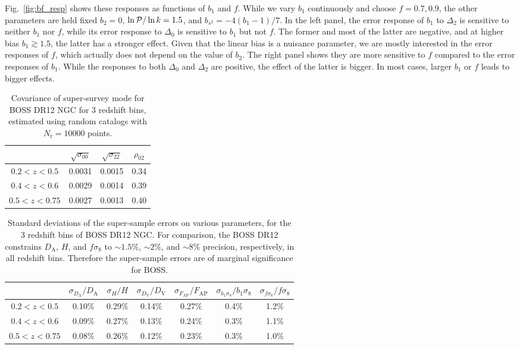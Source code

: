 \documentclass[a4paper,11pt]{article}
\let\d\relax
\DeclareMathOperator{\d}{d}
\newcommand{\Dist}[1]{D_\mathrm{#1}}
\newcommand{\FAP}{F_\mathrm{AP}}
\newcommand{\Pdimless}{\mathcal{P}}
\newcommand{\ran}{\mathrm{r}}
\begin{document}
Fig.~\ref{fig:bf_resp} shows these responses as functions of $b_1$ and $f$.
While we vary $b_1$ continuously and choose $f=0.7,0.9$, the other parameters
are held fixed $b_2=0$, $\d\ln\Pdimless/\d\ln k=1.5$, and $b_{s^2}=-4(b_1-1)/7$.
In the left panel, the error response of $b_1$ to $\Delta_2$ is sensitive to
neither $b_1$ nor $f$, while its error response to $\Delta_0$ is sensitive to
$b_1$ but not $f$.
The former and most of the latter are negative, and at higher bias
$b_1\gtrsim1.5$, the latter has a stronger effect.
Given that the linear bias is a nuisance parameter, we are mostly interested in
the error responses of $f$, which actually does not depend on the value of
$b_2$.
The right panel shows they are more sensitive to $f$ compared to the error
responses of $b_1$.
While the responses to both $\Delta_0$ and $\Delta_2$ are positive, the effect
of the latter is bigger.
In most cases, larger $b_1$ or $f$ leads to bigger effects.

\begin{table}[htpb]
    \centering
    \caption{Covariance of super-survey mode for BOSS DR12 NGC for 3 redshift
    bins, estimated using random catalogs with $N_\ran=10000$ points.}
    \label{tab:sigmaLL_boss}
    \begin{tabular}{c|ccc}
        \hline
        & $\sqrt{\sigma_{00}}$ & $\sqrt{\sigma_{22}}$ & $\rho_{02}$ \\
        \hline
        $0.2<z<0.5$ & 0.0031 & 0.0015 & 0.34 \\
        $0.4<z<0.6$ & 0.0029 & 0.0014 & 0.39 \\
        $0.5<z<0.75$& 0.0027 & 0.0013 & 0.40 \\
        \hline
    \end{tabular}
\end{table}

\begin{table}[htpb]
    \centering
    \caption{Standard deviations of the super-sample errors on various
    parameters, for the 3 redshift bins of BOSS DR12 NGC.
    For comparison, the BOSS DR12 constrains $\Dist{A}$, $H$, and $f\sigma_8$
    to $\sim1.5\%$, $\sim2\%$, and $\sim8\%$ precision, respectively, in all
    redshift bins.
    Therefore the super-sample errors are of marginal significance for BOSS.
    }
    \label{tab:impact}
    \begin{tabular}{c|cccccc}
        \hline
        & $\sigma_{\Dist{A}}/\Dist{A}$ & $\sigma_H/H$ & $\sigma_{\Dist{V}}/\Dist{V}$
        & $\sigma_{\FAP}/\FAP$ & $\sigma_{b_1\sigma_8}/b_1\sigma_8$ & $\sigma_{f\sigma_8}/f\sigma_8$ \\
        \hline
        $0.2<z<0.5$ & 0.10\% & 0.29\% & 0.14\% & 0.27\% & 0.4\% & 1.2\% \\
        $0.4<z<0.6$ & 0.09\% & 0.27\% & 0.13\% & 0.24\% & 0.3\% & 1.1\% \\
        $0.5<z<0.75$& 0.08\% & 0.26\% & 0.12\% & 0.23\% & 0.3\% & 1.0\% \\
        \hline
    \end{tabular}
\end{table}
\end{document}
